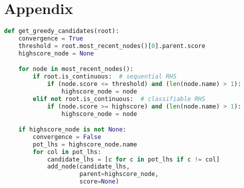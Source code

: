 \section{Appendix}

\begin{lstlisting}[caption={`Greedy' Candidate Generation in DepDetector},captionpos=b,language=Python,label=lst:greedy-depdetector]
def get_greedy_candidates(root):
    convergence = True
    threshold = root.most_recent_nodes()[0].parent.score
    highscore_node = None

    for node in most_recent_nodes():
        if root.is_continuous:  # sequential RHS
            if (node.score <= threshold) and (len(node.name) > 1):
                highscore_node = node
        elif not root.is_continuous:  # classifiable RHS
            if (node.score >= highscore) and (len(node.name) > 1):
                highscore_node = node

    if highscore_node is not None:
        convergence = False
        pot_lhs = highscore_node.name
        for col in pot_lhs:
            candidate_lhs = [c for c in pot_lhs if c != col]
            add_node(candidate_lhs,
                     parent=highscore_node,
                     score=None)
\end{lstlisting}
